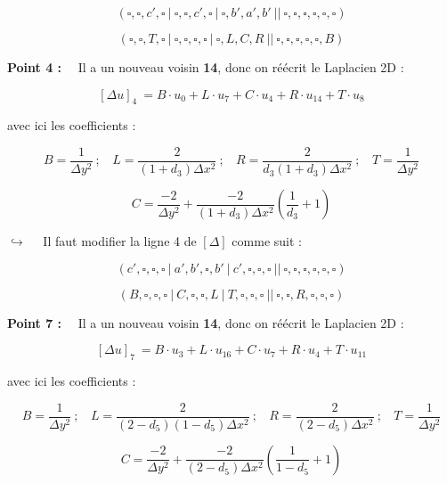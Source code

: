 \documentclass[12pt]{article}
\begin{document}
$$(\square,\square,c',\square~|~\square,\square,c',\square~|~\square,b',a',b'~||~\square,\square,\square,\square,\square,\square)$$

$$(\square,\square,T,\square~|~\square,\square,\square,\square~|~\square,L,C,R~||~\square,\square,\square,\square,\square,B)$$

\vspace{5 mm}

\noindent
\textbf{Point 4 :}~~ Il a un nouveau voisin \textbf{14}, donc on réécrit le Laplacien 2D :

$$[\Delta u]_{4}~ = B \cdot u_{0} + L \cdot u_{7} + C \cdot u_{4} + R \cdot u_{14} + T \cdot u_{8}$$

\vspace{5 mm}
\noindent
avec ici les coefficients :

$$B = \frac{1}{\Delta y^2}~;~~~~ L = \frac{2}{(1+d_3) \Delta x^2}~;~~~~ R = \frac{2}{d_3 (1+d_3) \Delta x^2}~;~~~~ T = \frac{1}{\Delta y^2}$$

$$C = \frac{-2}{\Delta y^2} + \frac{-2}{(1+d_3) \Delta x^2} \left( \frac{1}{d_3} + 1 \right)$$

\vspace{5 mm}

$\hookrightarrow$~~ Il faut modifier la ligne 4 de $[\Delta]$ comme suit :

$$(c',\square,\square,\square~|~a',b',\square,b'~|~c',\square,\square,\square~||~\square,\square,\square,\square,\square,\square)$$

$$(B,\square,\square,\square~|~C,\square,\square,L~|~T,\square,\square,\square~||~\square,\square,R,\square,\square,\square)$$

\vspace{5 mm}

\newpage

\noindent
\textbf{Point 7 :}~~ Il a un nouveau voisin \textbf{14}, donc on réécrit le Laplacien 2D :

$$[\Delta u]_{7}~ = B \cdot u_{3} + L \cdot u_{16} + C \cdot u_{7} + R \cdot u_{4} + T \cdot u_{11}$$

\vspace{5 mm}
\noindent
avec ici les coefficients :

$$B = \frac{1}{\Delta y^2}~;~~~~ L = \frac{2}{(2-d_5)(1-d_5) \Delta x^2}~;~~~~ R = \frac{2}{(2-d_5) \Delta x^2}~;~~~~ T = \frac{1}{\Delta y^2}$$

$$C = \frac{-2}{\Delta y^2} + \frac{-2}{(2-d_5) \Delta x^2} \left( \frac{1}{1-d_5} + 1 \right)$$
\end{document}
